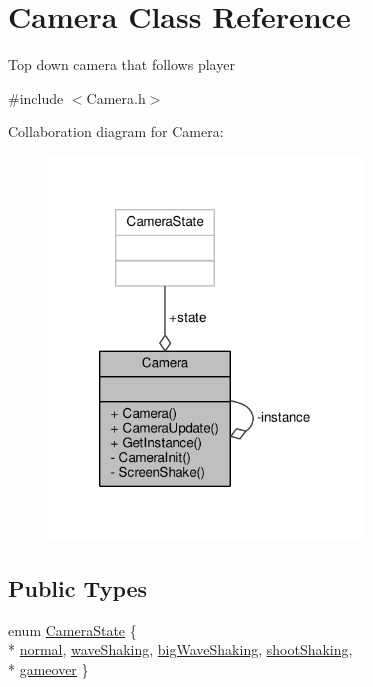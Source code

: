\hypertarget{class_camera}{\section{Camera Class Reference}
\label{class_camera}
}


Top down camera that follows player  




{\ttfamily \#include $<$Camera.\-h$>$}



Collaboration diagram for Camera\-:
\nopagebreak
\begin{figure}[H]
\begin{center}
\leavevmode
\includegraphics[width=238pt]{class_camera__coll__graph}
\end{center}
\end{figure}
\subsection*{Public Types}
\begin{DoxyCompactItemize}
\item 
enum \hyperlink{class_camera_a1ddf5d726e6c1d1d1c08d96d42c40236}{Camera\-State} \{ \\*
\hyperlink{class_camera_a1ddf5d726e6c1d1d1c08d96d42c40236abb7299ba8c5dcce883fe6987df129b1c}{normal}, 
\hyperlink{class_camera_a1ddf5d726e6c1d1d1c08d96d42c40236a9bb1793c9685b74a790ea306a7852179}{wave\-Shaking}, 
\hyperlink{class_camera_a1ddf5d726e6c1d1d1c08d96d42c40236a3a50c28c61cd1a7f837b32c54a65c92d}{big\-Wave\-Shaking}, 
\hyperlink{class_camera_a1ddf5d726e6c1d1d1c08d96d42c40236a0face68fe0053d79d3a1b03bd2a2645b}{shoot\-Shaking}, 
\\*
\hyperlink{class_camera_a1ddf5d726e6c1d1d1c08d96d42c40236a4d150a6fd04ef129c37e767d9087fa9f}{gameover}
 \}
\end{DoxyCompactItemize}
